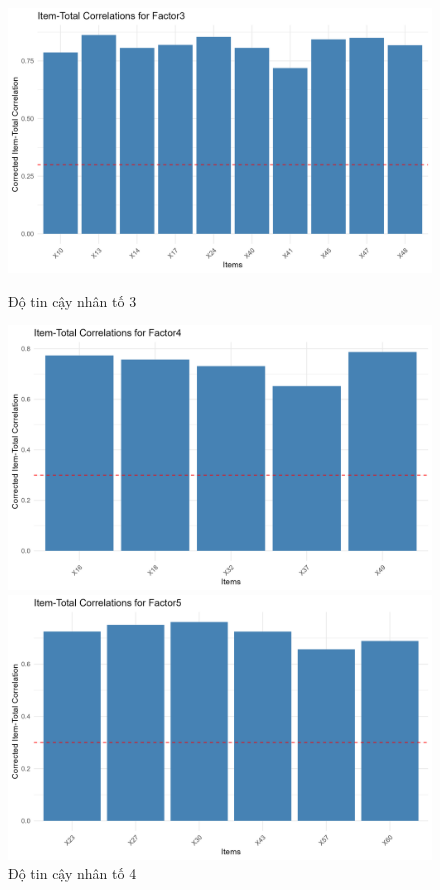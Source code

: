 \begin{figure}[h!]
    \centering
    \begin{minipage}{0.3\textwidth}
        \centering
        \includegraphics[width=\textwidth]{../../assets/images/reliability_Factor3.png}
        \caption{Độ tin cậy nhân tố 3}
    \end{minipage}
    \hfill
    \begin{minipage}{0.3\textwidth}
        \centering
        \includegraphics[width=\textwidth]{../../assets/images/reliability_Factor4.png}
        \caption{Độ tin cậy nhân tố 4}
    \end{minipage}
    \hfill
    \begin{minipage}{0.3\textwidth}
        \centering
        \includegraphics[width=\textwidth]{../../assets/images/reliability_Factor5.png}

\end{minipage}
\end{figure}
